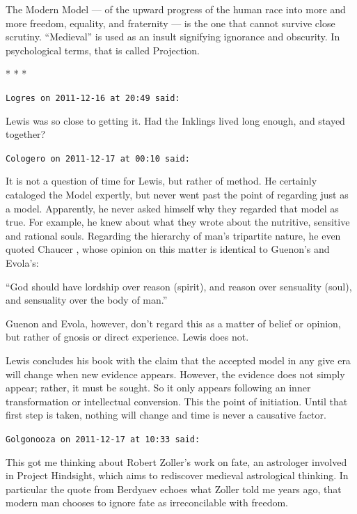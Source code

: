 The Modern Model --- of the upward progress of the human race into more and more freedom, equality, and fraternity --- is the one that cannot survive close scrutiny. ``Medieval'' is used as an insult signifying ignorance and obscurity. In psychological terms, that is called Projection.



\begin{center}* * *\end{center}

\begin{footnotesize}
\begin{sffamily}
\texttt{Logres on 2011-12-16 at 20:49 said:}

Lewis was so close to getting it. Had the Inklings lived long enough, and stayed together?

\hfill

\texttt{Cologero on 2011-12-17 at 00:10 said:}

It is not a question of time for Lewis, but rather of method. He certainly cataloged the Model expertly, but never went past the point of regarding just as a model. Apparently, he never asked himself why they regarded that model as true. For example, he knew about what they wrote about the nutritive, sensitive and rational souls. Regarding the hierarchy of man's tripartite nature, he even quoted Chaucer , whose opinion on this matter is identical to Guenon's and Evola's:

``God should have lordship over reason (spirit), and reason over sensuality (soul), and sensuality over the body of man.''

Guenon and Evola, however, don't regard this as a matter of belief or opinion, but rather of gnosis or direct experience. Lewis does not.

Lewis concludes his book with the claim that the accepted model in any give era will change when new evidence appears. However, the evidence does not simply appear; rather, it must be sought. So it only appears following an inner transformation or intellectual conversion. This the point of initiation. Until that first step is taken, nothing will change and time is never a causative factor.

\hfill

\texttt{Golgonooza on 2011-12-17 at 10:33 said:}

This got me thinking about Robert Zoller's work on fate, an astrologer involved in Project Hindsight, which aims to rediscover medieval astrological thinking. In particular the quote from Berdyaev echoes what Zoller told me years ago, that modern man chooses to ignore fate as irreconcilable with freedom.


\end{sffamily}
\end{footnotesize}
